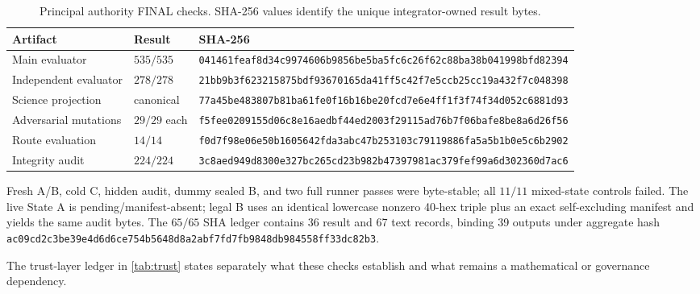 \begin{table}[H]
\centering
\caption{Principal authority FINAL checks.  SHA-256 values identify the unique
integrator-owned result bytes.}
\label{tab:authority-final}
\scriptsize
\begin{tabularx}{\textwidth}{@{}L{2.8cm}L{1.8cm}Y@{}}
\toprule
Artifact & Result & SHA-256 \\
\midrule
Main evaluator & $535/535$ &
\nolinkurl{041461feaf8d34c9974606b9856be5ba5fc6c26f62c88ba38b041998bfd82394} \\
Independent evaluator & $278/278$ &
\nolinkurl{21bb9b3f623215875bdf93670165da41ff5c42f7e5ccb25cc19a432f7c048398} \\
Science projection & canonical &
\nolinkurl{77a45be483807b81ba61fe0f16b16be20fcd7e6e4ff1f3f74f34d052c6881d93} \\
Adversarial mutations & $29/29$ each &
\nolinkurl{f5fee0209155d06c8e16aedbf44ed2003f29115ad76b7f06bafe8be8a6d26f56} \\
Route evaluation & $14/14$ &
\nolinkurl{f0d7f98e06e50b1605642fda3abc47b253103c79119886fa5a5b1b0e5c6b2902} \\
Integrity audit & $224/224$ &
\nolinkurl{3c8aed949d8300e327bc265cd23b982b47397981ac379fef99a6d302360d7ac6} \\
\bottomrule
\end{tabularx}
\end{table}

Fresh A/B, cold C, hidden audit, dummy sealed B, and two full runner passes
were byte-stable; all $11/11$ mixed-state controls failed.  The live State A is
pending/manifest-absent; legal B uses an identical lowercase nonzero 40-hex
triple plus an exact self-excluding manifest and yields the same audit bytes.
The $65/65$ SHA ledger contains 36 result and 67 text records, binding 39
outputs under aggregate hash
\nolinkurl{ac09cd2c3be39e4d6d6ce754b5648d8a2abf7fd7fb9848db984558ff33dc82b3}.

The trust-layer ledger in \cref{tab:trust} states separately what these checks
establish and what remains a mathematical or governance dependency.
